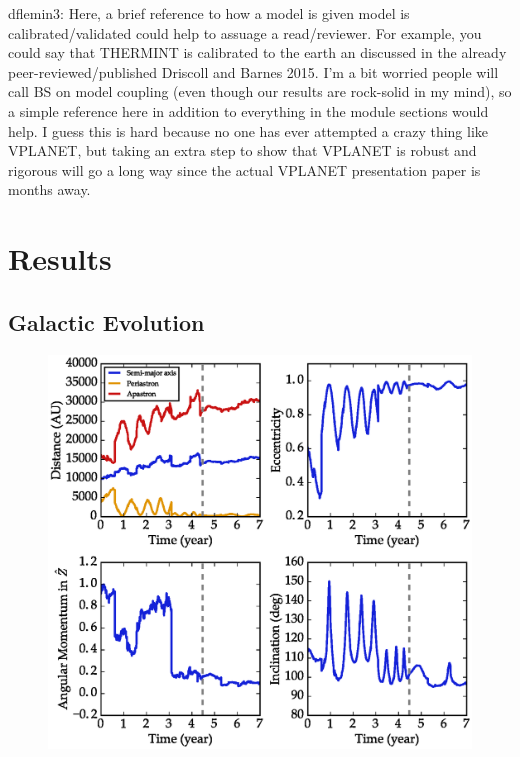 \documentclass[preprint,12pt]{aastex}
\newcommand{\xxx}[1]{{\color{red} #1}} %
\begin{document}
\xxx{dflemin3: Here, a brief reference to how a model is given model is calibrated/validated
could help to assuage a read/reviewer.  For example, you could say that THERMINT is calibrated
to the earth an discussed in the already peer-reviewed/published Driscoll and Barnes 2015.  I'm a bit 
worried people will call BS on model coupling (even though our results are rock-solid in my mind), so
a simple reference here in addition to everything in the module sections would help.  I guess this is hard because
no one has ever attempted a crazy thing like VPLANET, but taking an extra step to show that VPLANET is robust
and rigorous will go a long way since the actual VPLANET presentation paper is months away.}


\section{Results\label{sec:results}}

\subsection{Galactic Evolution}
\label{sec:results:galactic}


\begin{figure}
\includegraphics[width=\textwidth]{evol_Vpl_0257.eps}
\caption{}
\label{fig:galevolution}
\end{figure}
\end{document}

